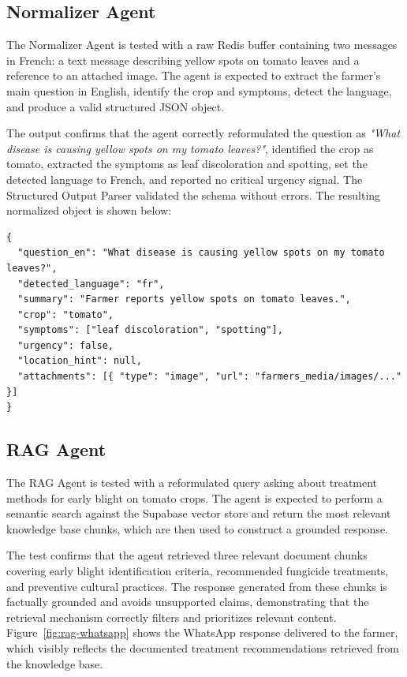 \subsection{Normalizer Agent}

The Normalizer Agent is tested with a raw Redis buffer containing two messages in French: a text message describing yellow spots on tomato leaves and a reference to an attached image. The agent is expected to extract the farmer's main question in English, identify the crop and symptoms, detect the language, and produce a valid structured JSON object.

The output confirms that the agent correctly reformulated the question as \textit{"What disease is causing yellow spots on my tomato leaves?"}, identified the crop as tomato, extracted the symptoms as leaf discoloration and spotting, set the detected language to French, and reported no critical urgency signal. The Structured Output Parser validated the schema without errors. The resulting normalized object is shown below:

\begin{verbatim}
{
  "question_en": "What disease is causing yellow spots on my tomato leaves?",
  "detected_language": "fr",
  "summary": "Farmer reports yellow spots on tomato leaves.",
  "crop": "tomato",
  "symptoms": ["leaf discoloration", "spotting"],
  "urgency": false,
  "location_hint": null,
  "attachments": [{ "type": "image", "url": "farmers_media/images/..." }]
}
\end{verbatim}

\subsection{RAG Agent}

The RAG Agent is tested with a reformulated query asking about treatment methods for early blight on tomato crops. The agent is expected to perform a semantic search against the Supabase vector store and return the most relevant knowledge base chunks, which are then used to construct a grounded response.

The test confirms that the agent retrieved three relevant document chunks covering early blight identification criteria, recommended fungicide treatments, and preventive cultural practices. The response generated from these chunks is factually grounded and avoids unsupported claims, demonstrating that the retrieval mechanism correctly filters and prioritizes relevant content. Figure~\ref{fig:rag-whatsapp} shows the WhatsApp response delivered to the farmer, which visibly reflects the documented treatment recommendations retrieved from the knowledge base.

